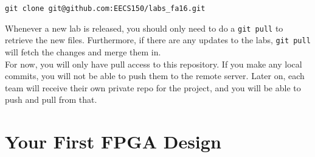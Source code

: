 \documentclass[11pt]{article}
\begin{document}
\begin{verbatim}
git clone git@github.com:EECS150/labs_fa16.git
\end{verbatim}

Whenever a new lab is released, you should only need to do a \verb|git pull| to retrieve the new files. Furthermore, if there are any updates to the labs, \verb|git pull| will fetch the changes and merge them in.\\

For now, you will only have pull access to this repository. If you make any local commits, you will not be able to push them to the remote server. Later on, each team will receive their own private repo for the project, and you will be able to push and pull from that.

\section{Your First FPGA Design}
\end{document}

